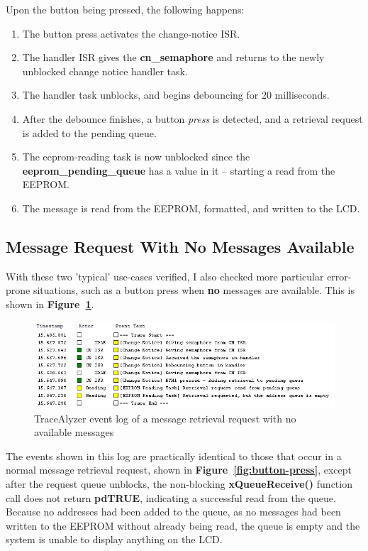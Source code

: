 \documentclass[a4paper, 12pt]{article}
\begin{document}
Upon the button being pressed, the following happens:

\begin{enumerate}
\item The button press activates the change-notice ISR.
\item The handler ISR gives the \textbf{cn\_semaphore} and returns to the newly unblocked change notice handler task.
\item The handler task unblocks, and begins debouncing for 20 milliseconds.
\item After the debounce finishes, a button \emph{press} is detected, and a retrieval request is added to the pending queue.
\item The eeprom-reading task is now unblocked since the \textbf{eeprom\_pending\_queue} has a value in it -- starting a read from the EEPROM.
\item The message is read from the EEPROM, formatted, and written to the LCD.
\end{enumerate}

\subsection{Message Request With No Messages Available}
With these two 'typical' use-cases verified, I also checked more particular error-prone situations, such as a button press when \textbf{no} messages are available. This is shown in \textbf{Figure~\ref{fig:button-press-no-message}}.

\begin{figure}[H]
\centering
\includegraphics[width=\textwidth]{button-press-no-message.PNG}
\caption{TraceAlyzer event log of a message retrieval request with no available messages}
\label{fig:button-press-no-message}
\end{figure}

The events shown in this log are practically identical to those that occur in a normal message retrieval request, shown in \textbf{Figure~\ref{fig:button-press}}, except after the request queue unblocks, the non-blocking \textbf{xQueueReceive()} function call does not return \textbf{pdTRUE}, indicating a successful read from the queue. Because no addresses had been added to the queue, as no messages had been written to the EEPROM without already being read, the queue is empty and the system is unable to display anything on the LCD.
\end{document}
